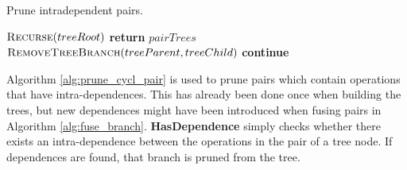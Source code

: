 \documentclass[12pt,a4paper,onecolumn,twoside,openright]{report}
\begin{document}
\begin{algorithm}[H]
	\caption{Prune intradependent pairs.} \label{alg:prune_cycl_pair}
	\small
	\begin{algorithmic}
			\State $\Call{Recurse}{treeRoot}$
		\EndFor
		\State \textbf{return} $pairTrees$
	\EndFunction
	\\
				\State $\Call{RemoveTreeBranch}{treeParent, treeChild}$
				\State \textbf{continue}

			\EndIf
			\State {}
		\EndFor
	\EndFunction
	\end{algorithmic}
\end{algorithm}
Algorithm \ref{alg:prune_cycl_pair} is used to prune pairs which contain operations that have intra-dependences. This has already been done once when building the trees, but new dependences might have been introduced when fusing pairs in Algorithm \ref{alg:fuse_branch}. \textbf{HasDependence} simply checks whether there exists an intra-dependence between the operations in the pair of a tree node. If dependences are found, that branch is pruned from the tree.
\\
\end{document}

